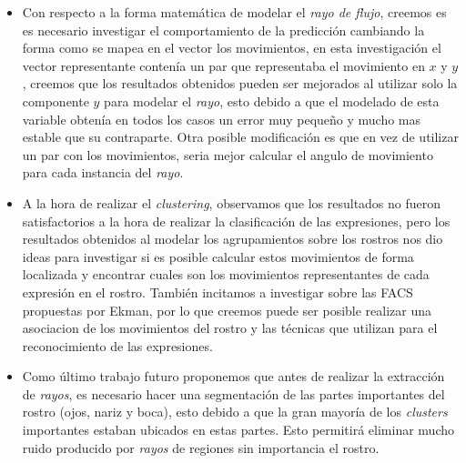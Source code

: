 \begin{itemize}
	
	\item Con respecto a la forma matemática de modelar el \textit{rayo de flujo}, creemos es es necesario investigar el comportamiento de la predicción cambiando la forma como se mapea en el vector los movimientos, en esta investigación el vector representante contenía un par que representaba el movimiento en $x$ y $y$, creemos que los resultados obtenidos pueden ser mejorados al utilizar solo la componente $y$ para modelar el \textit{rayo}, esto debido a que el modelado de esta variable obtenía en todos los casos un error muy pequeño y mucho mas estable que su contraparte. Otra posible modificación es que en vez de utilizar un par con los movimientos, seria mejor calcular el angulo de movimiento para cada instancia del \textit{rayo}.
	
	\item A la hora de realizar el \textit{clustering}, observamos que los resultados no fueron satisfactorios a la hora de realizar la clasificación de las expresiones, pero los resultados obtenidos al modelar los agrupamientos sobre los rostros nos dio ideas para investigar si es posible calcular estos movimientos de forma localizada y encontrar cuales son los movimientos representantes de cada expresión en el rostro. También incitamos a investigar sobre las FACS propuestas por Ekman, por lo que creemos puede ser posible realizar una asociacion de los movimientos del rostro y las técnicas que utilizan para el reconocimiento de las expresiones.
	
	\item Como último trabajo futuro proponemos que antes de realizar la extracción de \textit{rayos}, es necesario hacer una segmentación de las partes importantes del rostro (ojos, nariz y boca), esto debido a que la gran mayoría de los \textit{clusters} importantes estaban ubicados en estas partes. Esto permitirá eliminar mucho ruido producido por \textit{rayos} de regiones sin importancia el rostro.
	
\end{itemize}